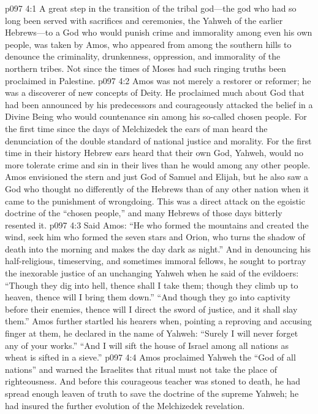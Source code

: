 \vs p097 4:1 A great step in the transition of the tribal god---the god who had so long been served with sacrifices and ceremonies, the Yahweh of the earlier Hebrews---to a God who would punish crime and immorality among even his own people, was taken by Amos, who appeared from among the southern hills to denounce the criminality, drunkenness, oppression, and immorality of the northern tribes. Not since the times of Moses had such ringing truths been proclaimed in Palestine.\plusone
\vs p097 4:2 Amos was not merely a restorer or reformer; he was a discoverer of new concepts of Deity. He proclaimed much about God that had been announced by his predecessors and courageously attacked the belief in a Divine Being who would countenance sin among his so\hyp{}called chosen people. For the first time since the days of Melchizedek the ears of man heard the denunciation of the double standard of national justice and morality. For the first time in their history Hebrew ears heard that their own God, Yahweh, would no more tolerate crime and sin in their lives than he would among any other people. Amos envisioned the stern and just God of Samuel and Elijah, but he also saw a God who thought no differently of the Hebrews than of any other nation when it came to the punishment of wrongdoing. This was a direct attack on the egoistic doctrine of the “chosen people,” and many Hebrews of those days bitterly resented it.\plusone
\vs p097 4:3 Said Amos: “He who formed the mountains and created the wind, seek him who formed the seven stars and Orion, who turns the shadow of death into the morning and makes the day dark as night.” And in denouncing his half\hyp{}religious, timeserving, and sometimes immoral fellows, he sought to portray the inexorable justice of an unchanging Yahweh when he said of the evildoers: “Though they dig into hell, thence shall I take them; though they climb up to heaven, thence will I bring them down.” “And though they go into captivity before their enemies, thence will I direct the sword of justice, and it shall slay them.” Amos further startled his hearers when, pointing a reproving and accusing finger at them, he declared in the name of Yahweh: “Surely I will never forget any of your works.” “And I will sift the house of Israel among all nations as wheat is sifted in a sieve.”
\vs p097 4:4 Amos proclaimed Yahweh the “God of all nations” and warned the Israelites that ritual must not take the place of righteousness. And before this courageous teacher was stoned to death, he had spread enough leaven of truth to save the doctrine of the supreme Yahweh; he had insured the further evolution of the Melchizedek revelation.

